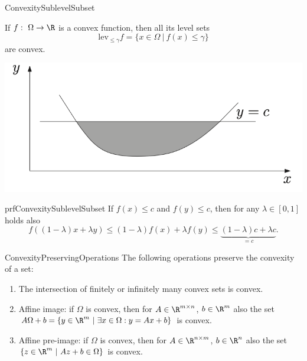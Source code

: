 
\begin{theo}{ConvexitySublevelSubset}
    \vspace*{-0.7cm}
    \begin{minipage}{0.56\textwidth}
        If $f: \ \Omega \rightarrow \R$ is a convex function, then all its level sets 
        \begin{equation*}
            \text{lev}_{\leq \gamma}f = \{x \in \Omega \ | \ f(x) \leq \gamma\}
        \end{equation*}
        are convex.
    \end{minipage}
    \begin{minipage}{0.42\textwidth}
        \begin{center}
            \vspace*{0.2cm}
            \includegraphics[scale = 0.495]{Images/Fundamental/ConvexSubset.png}
        \end{center}
    \end{minipage}
    \vspace{-0.3cm}
\end{theo}

\begin{prf}{prfConvexitySublevelSubset}
    If $f(x) \leq c$ and $f(y) \leq c$, then for any $\lambda \in [0,1]$ holds also 
    \begin{equation*}
        f((1-\lambda)x + \lambda y) \leq (1-\lambda)f(x) + \lambda f(y) \leq \underset{= c}{\underbrace{(1-\lambda)c + \lambda c}}.
    \end{equation*}
    \vspace*{-0.7cm}
\end{prf}

\begin{pro}{ConvexityPreservingOperations}
    The following operations preserve the convexity of a set:
    \begin{enumerate}
        \item The intersection of finitely or infinitely many convex sets is convex.
        \item Affine image: if $\Omega$ is convex, then for $A \in \R^{m \times n}$, $b \in \R^m$ also the set $A\Omega + b = \{ y \in \R^m \ | \ \exists x \in \Omega : y = Ax + b \}$ is convex.
        \item Affine pre-image: if $\Omega$ is convex, then for $A \in \R^{n \times m}$, $b \in \R^n$ also the set $\{ z \in \R^m \ | \ Az + b \in \Omega \}$ is convex.
    \end{enumerate}
\end{pro}

